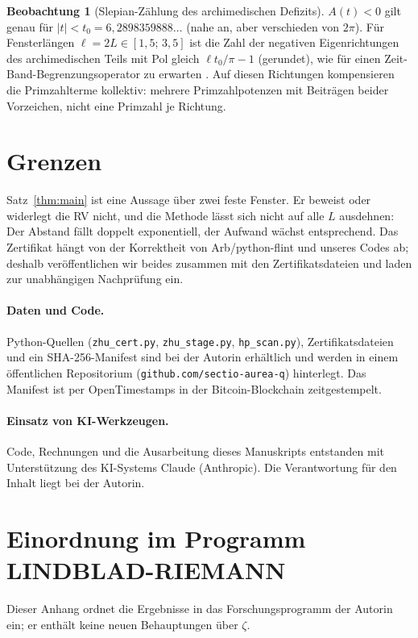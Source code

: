 \documentclass[11pt,a4paper]{article}
\theoremstyle{definition}
\newtheorem{observation}{Beobachtung}
\begin{document}
\begin{observation}[Slepian-Zählung des archimedischen Defizits]
$A(t)<0$ gilt genau für $|t|<t_0=6{,}2898359888\ldots$ (nahe an, aber verschieden von $2\pi$). Für Fensterlängen $\ell=2L\in[1{,}5;\,3{,}5]$ ist die Zahl der negativen Eigenrichtungen des archimedischen Teils mit Pol gleich $\ell t_0/\pi-1$ (gerundet), wie für einen Zeit-Band-Begrenzungsoperator zu erwarten \cite{SlepianPollak61,LandauWidom80}. Auf diesen Richtungen kompensieren die Primzahlterme kollektiv: mehrere Primzahlpotenzen mit Beiträgen beider Vorzeichen, nicht eine Primzahl je Richtung.
\end{observation}

\section{Grenzen}
Satz~\ref{thm:main} ist eine Aussage über zwei feste Fenster. Er beweist oder widerlegt die RV nicht, und die Methode lässt sich nicht auf alle $L$ ausdehnen: Der Abstand fällt doppelt exponentiell, der Aufwand wächst entsprechend. Das Zertifikat hängt von der Korrektheit von Arb/python-flint und unseres Codes ab; deshalb veröffentlichen wir beides zusammen mit den Zertifikatsdateien und laden zur unabhängigen Nachprüfung ein.

\paragraph{Daten und Code.} Python-Quellen (\texttt{zhu\_cert.py}, \texttt{zhu\_stage.py}, \texttt{hp\_scan.py}), Zertifikatsdateien und ein SHA-256-Manifest sind bei der Autorin erhältlich und werden in einem öffentlichen Repositorium (\texttt{github.com/sectio-aurea-q}) hinterlegt. Das Manifest ist per OpenTimestamps in der Bitcoin-Blockchain zeitgestempelt.

\paragraph{Einsatz von KI-Werkzeugen.} Code, Rechnungen und die Ausarbeitung dieses Manuskripts entstanden mit Unterstützung des KI-Systems Claude (Anthropic). Die Verantwortung für den Inhalt liegt bei der Autorin.

\appendix
\section{Einordnung im Programm LINDBLAD-RIEMANN}
Dieser Anhang ordnet die Ergebnisse in das Forschungsprogramm der Autorin ein; er enthält keine neuen Behauptungen über $\zeta$.
\end{document}
